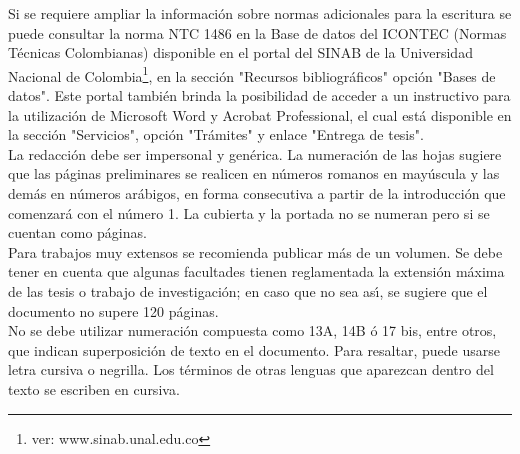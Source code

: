 Si se requiere ampliar la informaci\'{o}n sobre normas adicionales para la escritura se puede consultar la norma NTC 1486 en la Base de datos del ICONTEC (Normas T\'{e}cnicas Colombianas) disponible en el portal del SINAB de la Universidad Nacional de Colombia\footnote{ver: www.sinab.unal.edu.co}, en la secci\'{o}n "Recursos bibliogr\'{a}ficos" opci\'{o}n "Bases de datos".  Este portal tambi\'{e}n brinda la posibilidad de acceder a un instructivo para la utilizaci\'{o}n de Microsoft Word y Acrobat Professional, el cual est\'{a} disponible en la secci\'{o}n "Servicios", opci\'{o}n "Tr\'{a}mites" y enlace "Entrega de tesis".\\

La redacci\'{o}n debe ser impersonal y gen\'{e}rica. La numeraci\'{o}n de las hojas sugiere que las p\'{a}ginas preliminares se realicen en n\'{u}meros romanos en may\'{u}scula y las dem\'{a}s en n\'{u}meros ar\'{a}bigos, en forma consecutiva a partir de la introducci\'{o}n que comenzar\'{a} con el n\'{u}mero 1. La cubierta y la portada no se numeran pero si se cuentan como p\'{a}ginas.\\

Para trabajos muy extensos se recomienda publicar m\'{a}s de un volumen. Se debe tener en cuenta que algunas facultades tienen reglamentada la extensi\'{o}n m\'{a}xima de las tesis  o trabajo de investigaci\'{o}n; en caso que no sea as\'{\i}, se sugiere que el documento no supere 120 p\'{a}ginas.\\

No se debe utilizar numeraci\'{o}n compuesta como 13A, 14B \'{o} 17 bis, entre otros, que indican superposici\'{o}n de texto en el documento. Para resaltar, puede usarse letra cursiva o negrilla. Los t\'{e}rminos de otras lenguas que aparezcan dentro del texto se escriben en cursiva.\\

\fi